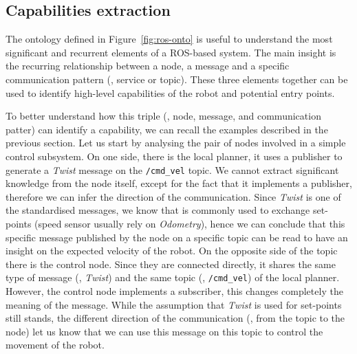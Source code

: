 \subsection{Capabilities extraction}
\label{sec:cap-ext}
The ontology defined in Figure~\ref{fig:ros-onto} is useful to understand the most significant and recurrent elements of a ROS-based system. The main insight is the recurring relationship between a node, a message and a specific communication pattern (\ie, service or topic). These three elements together can be used to identify high-level capabilities of the robot and potential entry points.

To better understand how this triple (\ie, node, message, and communication patter) can identify a capability, we can recall the examples described in the previous section. Let us start by analysing the pair of nodes involved in a simple control subsystem. On one side, there is the local planner, it uses a publisher to generate a \textit{Twist} message on the \texttt{/cmd\_vel} topic. We cannot extract significant knowledge from the node itself, except for the fact that it implements a publisher, therefore we can infer the direction of the communication. Since \textit{Twist} is one of the standardised messages, we know that is commonly used to exchange set-points (speed sensor usually rely on \textit{Odometry}), hence we can conclude that this specific message published by the node on a specific topic can be read to have an insight on the expected velocity of the robot. On the opposite side of the topic there is the control node. Since they are connected directly, it shares the same type of message (\ie, \textit{Twist}) and the same topic (\ie, \texttt{/cmd\_vel}) of the local planner. However, the control node implements a subscriber, this changes completely the meaning of the message. While the assumption that \textit{Twist} is used for set-points still stands, the different direction of the communication (\ie, from the topic to the node) let us know that we can use this message on this topic to control the movement of the robot.

